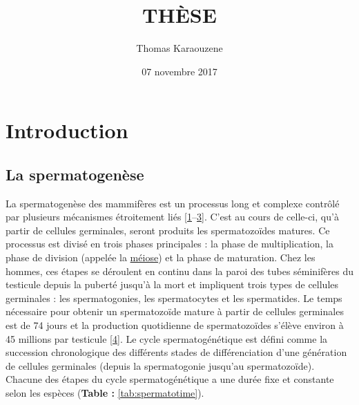 \documentclass[12pt,twoside]{ugathesis}
\title{THÈSE}
\author{Thomas Karaouzene}
\date{07 novembre 2017}
\theoremstyle{definition}
\theoremstyle{definition}
\theoremstyle{remark}
\begin{document}
  \maketitle

\frontmatter %
\pagestyle{empty} %



  \hypersetup{linkcolor=black}
  \setcounter{tocdepth}{3}
  \tableofcontents

  \listoftables

  \listoffigures



\mainmatter %
\pagestyle{fancyplain} %

\chapter{Introduction}\label{introInf}

\section{La spermatogenèse}\label{la-spermatogenese}

La spermatogenèse des mammifères est un processus long et complexe
contrôlé par plusieurs mécanismes étroitement liés
{[}\protect\hyperlink{ref-Gnessi1997}{1}--\protect\hyperlink{ref-KIERSZENBAUM1994}{3}{]}.
C'est au cours de celle-ci, qu'à partir de cellules germinales, seront
produits les spermatozoïdes matures. Ce processus est divisé en trois
phases principales : la phase de multiplication, la phase de division
(appelée la \protect\hyperlink{meiose}{méiose}) et la phase de
maturation. Chez les hommes, ces étapes se déroulent en continu dans la
paroi des tubes séminifères du testicule depuis la puberté jusqu'à la
mort et impliquent trois types de cellules germinales : les
spermatogonies, les spermatocytes et les spermatides. Le temps
nécessaire pour obtenir un spermatozoïde mature à partir de cellules
germinales est de 74 jours et la production quotidienne de
spermatozoïdes s'élève environ à 45 millions par testicule
{[}\protect\hyperlink{ref-Johnson1980}{4}{]}. Le cycle spermatogénétique
est défini comme la succession chronologique des différents stades de
différenciation d'une génération de cellules germinales (depuis la
spermatogonie jusqu'au spermatozoïde). Chacune des étapes du cycle
spermatogénétique a une durée fixe et constante selon les espèces
(\textbf{Table : }\ref{tab:spermatotime}).
\end{document}
